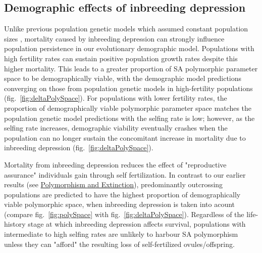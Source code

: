 \documentclass[11pt]{article}
\begin{document}
\subsection*{Demographic effects of inbreeding depression} \label{subsec:InbreedEffects}

Unlike previous population genetic models which assumed constant population sizes \citep{JordanConnallon2014,Olito2017}, mortality caused by inbreeding depression can strongly influence population persistence in our evolutionary demographic model. Populations with high fertility rates can sustain positive population growth rates despite this higher mortality. This leads to a greater proportion of SA polymorphic parameter space to be demographically viable, with the demographic model predictions converging on those from population genetic models in high-fertility populations (fig.~\ref{fig:deltaPolySpace}). For populations with lower fertility rates, the proportion of demographically viable polymorphic parameter space matches the population genetic model predictions with the selfing rate is low; however, as the selfing rate increases, demographic viability eventually crashes when the population can no longer sustain the concomitant increase in mortality due to inbreeding depression (fig.~\ref{fig:deltaPolySpace}). 

Mortality from inbreeding depression reduces the effect of "reproductive assurance" individuals gain through self fertilization. In contrast to our earlier results (see \hyperref[subsec:PolyExt]{Polymorphism and Extinction}), predominantly outcrossing populations are predicted to have the highest proportion of demographically viable polymorphic space, when inbreeding depression is taken into acount (compare fig.~\ref{fig:polySpace} with fig.~\ref{fig:deltaPolySpace}). Regardless of the life-history stage at which inbreeding depression affects survival, populations with intermediate to high selfing rates are unlikely to harbour SA polymorphism unless they can "afford" the resulting loss of self-fertilized ovules/offspring.
\end{document}
